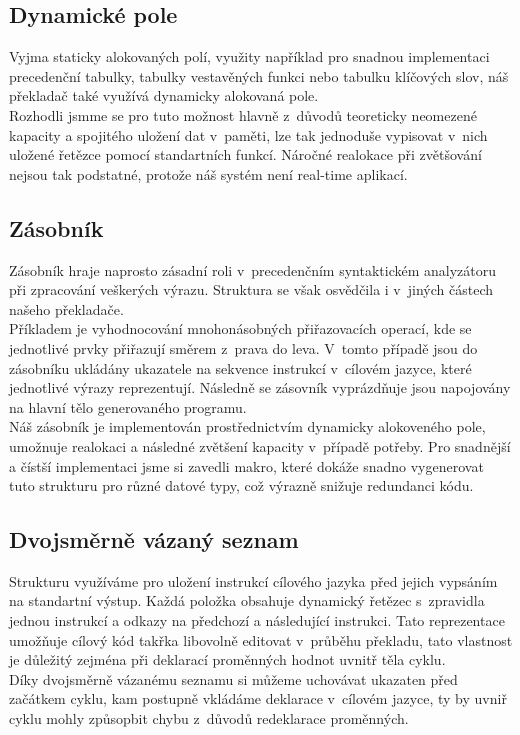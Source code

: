 \documentclass[11pt]{article}
\begin{document}
    \subsection{Dynamické pole}
        Vyjma staticky alokovaných polí, využity například pro snadnou implementaci precedenční tabulky, tabulky vestavěných funkci nebo tabulku klíčových slov, náš překladač také využívá dynamicky alokovaná pole. \\
        \indent Rozhodli jsmme se pro tuto možnost hlavně z~důvodů teoreticky neomezené kapacity a spojitého uložení dat v~paměti, lze tak jednoduše vypisovat v~nich uložené řetězce pomocí standartních funkcí. Náročné realokace při zvětšování nejsou tak podstatné, protože náš systém není real-time aplikací.
    
    \subsection{Zásobník}
        Zásobník hraje naprosto zásadní roli v~precedenčním syntaktickém analyzátoru při zpracování veškerých výrazu. Struktura se však osvědčila i v~jiných částech našeho
        překladače. \\
        \indent Příkladem je vyhodnocování mnohonásobných přiřazovacích operací, kde se
        jednotlivé prvky přiřazují směrem z~prava do leva. V~tomto případě jsou do zásobníku
        ukládány ukazatele na sekvence instrukcí v~cílovém jazyce, které jednotlivé výrazy
        reprezentují. Následně se zásovník vyprázdňuje jsou napojovány na hlavní tělo
        generovaného programu. \\
        \indent Náš zásobník je implementován prostřednictvím dynamicky alokoveného pole,
        umožnuje realokaci a následné zvětšení kapacity v~případě potřeby. Pro snadnější a
        čístší implementaci jsme si zavedli makro, které dokáže snadno vygenerovat tuto
        strukturu pro různé datové typy, což výrazně snižuje redundanci kódu.
        
    \subsection{Dvojsměrně vázaný seznam}
    \label{sec:dll}

        Strukturu využíváme pro uložení instrukcí cílového jazyka před jejich vypsáním na
        standartní výstup. Každá položka obsahuje dynamický řetězec s~zpravidla jednou
        instrukcí a odkazy na předchozí a následující instrukci. Tato reprezentace umožňuje
        cílový kód takřka libovolně editovat v~průběhu překladu, tato vlastnost je důležitý
        zejména při deklarací proměnných hodnot uvnitř těla cyklu. \\
        \indent Díky dvojsměrně vázanému seznamu si můžeme uchovávat ukazaten před začátkem
        cyklu, kam postupně vkládáme deklarace v~cílovém jazyce, ty by uvniř cyklu mohly
        způsopbit chybu z~důvodů redeklarace proměnných.
        
\end{document}
